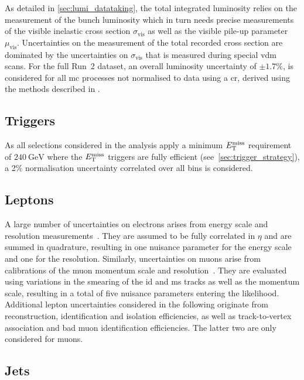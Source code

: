 As detailed in \cref{sec:lumi_datataking}, the total integrated luminosity relies on the measurement of the bunch luminosity which in turn needs precise measurements of the visible inelastic cross section $\sigma_\mathrm{vis}$ as well as the visible pile-up parameter $\mu_\mathrm{vis}$. Uncertainties on the measurement of the total recorded cross section are dominated by the uncertainties on $\sigma_\mathrm{vis}$ that is measured during special \gls{vdm} scans. For the full Run~2 dataset, an overall luminosity uncertainty of $\pm 1.7\%$, is considered for all \gls{mc} processes not normalised to data using a \gls{cr}, derived using the methods described in \cite{ATLAS-CONF-2019-021}.

\subsection{Triggers}

As all selections considered in the analysis apply a minimum $E_{\textrm{T}}^{\textrm{miss}}$ requirement of $\SI{240}{\GeV}$ where the $E_{\textrm{T}}^{\textrm{miss}}$ triggers are fully efficient (see~\cref{sec:trigger_strategy}), a 2\% normalisation uncertainty correlated over all bins is considered. 

\subsection{Leptons}

A large number of uncertainties on electrons arises from energy scale and resolution measurements~\cite{EGAM-2018-01,PERF-2017-01}. They are assumed to be fully correlated in $\eta$ and are summed in quadrature, resulting in one nuisance parameter for the energy scale and one for the resolution. Similarly, uncertainties on muons arise from calibrations of the muon momentum scale and resolution~\cite{PERF-2015-10}. They are evaluated using variations in the smearing of the \gls{id} and \gls{ms} tracks as well as the momentum scale, resulting in a total of five nuisance parameters entering the likelihood. Additional lepton uncertainties considered in the following originate from reconstruction, identification and isolation efficiencies, as well as track-to-vertex association and bad muon identification efficiencies. The latter two are only considered for muons.

\subsection{Jets}

